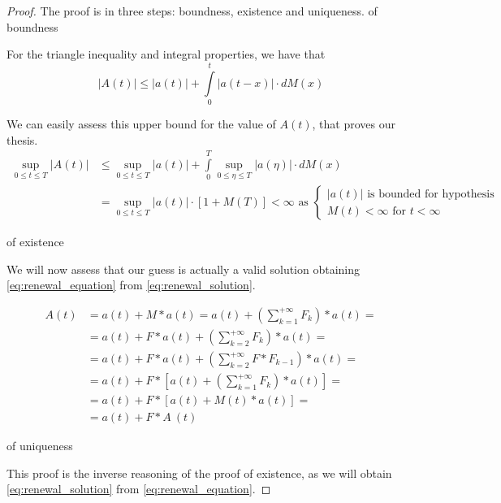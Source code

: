 \begin{proof}
	The proof is in three steps: boundness, existence and uniqueness.
	\proofpart of boundness \label{req:boundness}

	For the triangle inequality and integral properties, we have that
	$$ |A(t)| \le |a(t)| + \int\limits_0^{t}|a(t-x)| \cdot dM(x) $$

	We can easily assess this upper bound for the value of $A(t)$, that proves our thesis.
	\begin{equation}\begin{split}
		\sup_{0\le t \le T} |A(t)| & \le \sup_{0\le t \le T} |a(t)| + \int\limits_0^{T}\sup_{0\le \eta \le T}|a(\eta)| \cdot dM(x) \\
		& = \sup_{0\le t \le T} |a(t)| \cdot [ 1+M(T) ] < \infty \text{ as }
		\begin{cases}
			|a(t)| \text{ is bounded for hypothesis} \\
			M(t) < \infty \text{ for } t<\infty
		\end{cases}
	\end{split}\end{equation}

	\proofpart of existence

		We will now assess that our guess is actually a valid solution obtaining \eqref{eq:renewal_equation} from \eqref{eq:renewal_solution}.

		\begin{equation}\begin{split}
			A(t) &= a(t) + M \ast a(t) = a(t) + \left(\sum\limits_{k=1}^{+\infty} F_k \right) \ast a(t) = \\
			&= a(t) + F \ast a(t) +\left(\sum\limits_{k=2}^{+\infty} F_k \right) \ast a(t) = \\
			&= a(t) + F \ast a(t) +\left(\sum\limits_{k=2}^{+\infty} F \ast F_{k-1} \right) \ast a(t) = \\
			&= a(t) + F \ast \left[ a(t) + \left(\sum\limits_{k=1}^{+\infty} F_k \right) \ast a(t) \right] = \\
			&= a(t) + F \ast \left[ a(t) + M(t) \ast a(t) \right] = \\
			&=a(t) + F \ast A ~ (t)
		\end{split}\end{equation}

	\proofpart of uniqueness

	This proof is the inverse reasoning of the proof of existence, as we will obtain \eqref{eq:renewal_solution} from \eqref{eq:renewal_equation}.


\end{proof}
